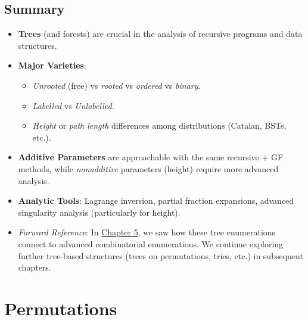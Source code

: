 \documentclass[11pt,letterpaper]{article}
\begin{document}
\subsection{Summary}
\begin{itemize}
  \item \textbf{Trees} (and forests) are crucial in the analysis of recursive programs and data structures.
  \item \textbf{Major Varieties}: 
    \begin{itemize}
      \item \emph{Unrooted} (free) vs \emph{rooted} vs \emph{ordered} vs \emph{binary}.
      \item \emph{Labelled} vs \emph{Unlabelled}.
      \item \emph{Height} or \emph{path length} differences among distributions (Catalan, BSTs, etc.).
    \end{itemize}
  \item \textbf{Additive Parameters} are approachable with the same recursive + GF methods, while \emph{nonadditive} parameters (height) require more advanced analysis.
  \item \textbf{Analytic Tools}: Lagrange inversion, partial fraction expansions, advanced singularity analysis (particularly for height).
  \item \emph{Forward Reference}: In \hyperref[ch:analytic-comb]{Chapter 5}, we saw how these tree enumerations connect to advanced combinatorial enumerations. We continue exploring further tree-based structures (trees on permutations, tries, etc.) in subsequent chapters.
\end{itemize}
\clearpage

\section{Permutations}
\end{document}
